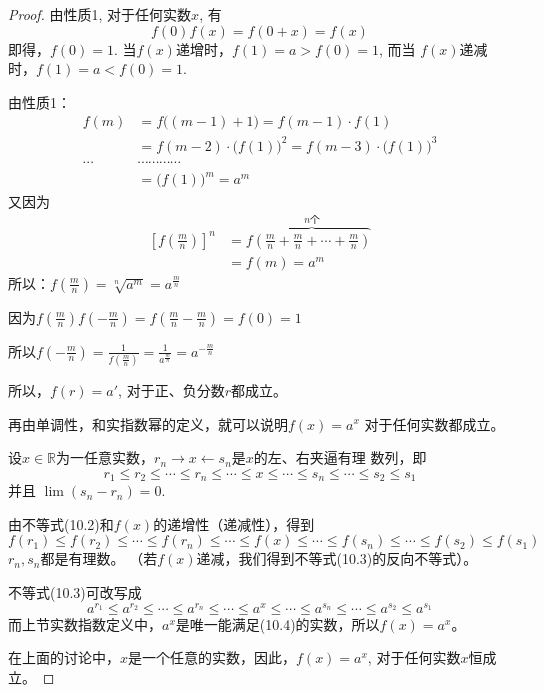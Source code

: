\begin{proof}
由性质1, 对于任何实数$x$, 有
\[f(0)f(x)=f(0+x)=f(x)\]
即得，$f(0)=1$. 当$f(x)$递增时，$f(1)=a>f(0)=1$, 而当
$f(x)$递减时，$f(1)=a<f(0)=1$.

由性质1：
\[\begin{split}
  f(m)&=f\big((m-1)+1\big)=f(m-1)\cdot f(1)\\
  &=f(m-2)\cdot \big(f(1)\big)^2=f(m-3)\cdot \big(f(1)\big)^3\\
\cdots & \cdots \cdots \cdots \cdots \\
&=\big(f(1)\big)^m=a^m
\end{split}\]
又因为
\[\begin{split}
  \left[f\left(\frac{m}{n}\right)\right]^n&=f\overbrace{\left(\frac{m}{n}+\frac{m}{n}+\cdots +\frac{m}{n}\right)}^{n\text{个}}\\
  &=f(m)=a^m
\end{split}\]
所以：$f\left(\frac{m}{n}\right)=\sqrt[n]{a^m}=a^{\tfrac{m}{n}}$

因为$f\left(\frac{m}{n}\right)f\left(-\frac{m}{n}\right)=f\left(\frac{m}{n}-\frac{m}{n}\right)=f(0)=1$

所以$f\left(-\frac{m}{n}\right)=\frac{1}{f\left(\frac{m}{n}\right)}=\frac{1}{a^{\tfrac{m}{n}}}=a^{-\tfrac{m}{n}}$

所以，$f(r)=a'$, 对于正、负分数$r$都成立。

再由单调性，和实指数幂的定义，就可以说明$f(x)=a^x$
对于任何实数都成立。

设$x\in\mathbb{R}$为一任意实数，$r_n\to x\leftarrow s_n$是$x$的左、右夹逼有理
数列，即
\begin{equation}
  r_1\le r_2\le \cdots \le r_n\le \cdots \le x\le \cdots \le s_n\le \cdots \le s_2\le s_1
\end{equation}
并且 $\lim(s_n-r_n)=0$.

由不等式(10.2)和$f(x)$的递增性（递减性），得到
\begin{equation}
  f(r_1)\le f(r_2)\le \cdots \le f(r_n)\le \cdots \le f(x)\le \cdots \le f(s_n)\le \cdots \le f(s_2)\le f(s_1)
\end{equation}
$r_n,s_n$都是有理数。
（若$f(x)$递减，我们得到不等式(10.3)的反向不等式）。

不等式(10.3)可改写成
\begin{equation}
  a^{r_1}\le a^{r_2}\le \cdots \le a^{r_n}\le \cdots \le a^{x}\le \cdots \le a^{s_n}\le \cdots \le a^{s_2}\le a^{s_1}
\end{equation}
而上节实数指数定义中，$a^x$是唯一能满足(10.4)的实数，所以$f(x)=a^x$。

在上面的讨论中，$x$是一个任意的实数，因此，$f(x)=
a^x$, 对于任何实数$x$恒成立。
\end{proof}

